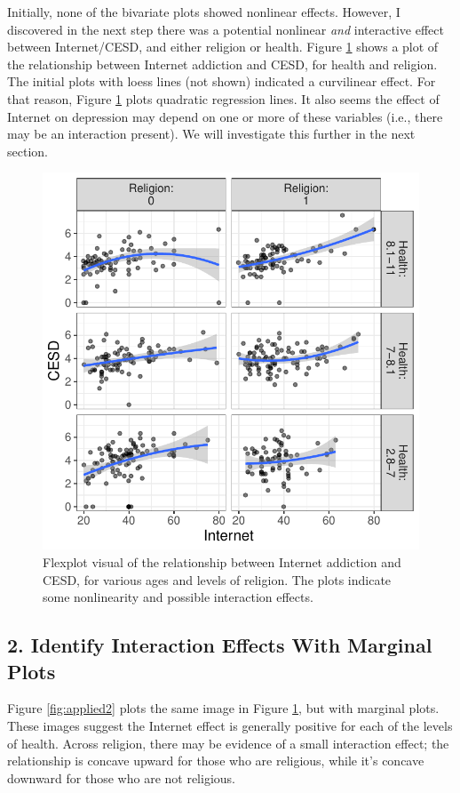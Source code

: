 \documentclass[
  man,floatsintext]{apa6}
\begin{document}
Initially, none of the bivariate plots showed nonlinear effects. However, I discovered in the next step there was a potential nonlinear \emph{and} interactive effect between Internet/CESD, and either religion or health. Figure \ref{fig:applied1} shows a plot of the relationship between Internet addiction and CESD, for health and religion. The initial plots with loess lines (not shown) indicated a curvilinear effect. For that reason, Figure \ref{fig:applied1} plots quadratic regression lines. It also seems the effect of Internet on depression may depend on one or more of these variables (i.e., there may be an interaction present). We will investigate this further in the next section.

\begin{figure}

{\centering \includegraphics[width=0.75\linewidth]{visual_partitions_files/figure-latex/applied1-1} 

}

\caption{Flexplot visual of the relationship between Internet addiction and CESD, for various ages and levels of religion. The plots indicate some nonlinearity and possible interaction effects.}\label{fig:applied1}
\end{figure}

\subsection{2. Identify Interaction Effects With Marginal Plots}\label{identify-interaction-effects-with-marginal-plots-1}

Figure \ref{fig:applied2} plots the same image in Figure \ref{fig:applied1}, but with marginal plots. These images suggest the Internet effect is generally positive for each of the levels of health. Across religion, there may be evidence of a small interaction effect; the relationship is concave upward for those who are religious, while it's concave downward for those who are not religious.
\end{document}
